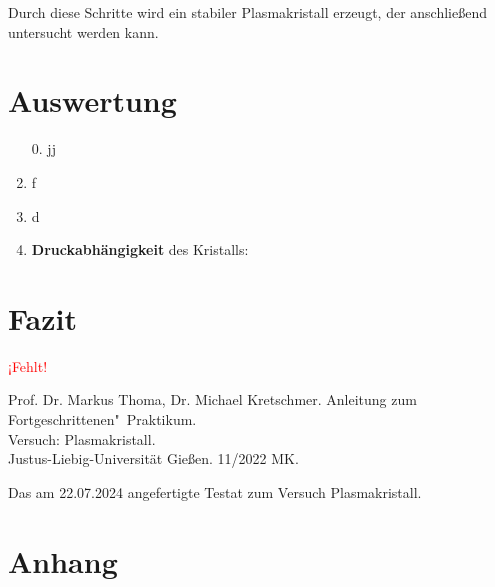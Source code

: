 \documentclass[12pt,a4paper,ngerman]{report}
\providecommand{\fehlt}{\textcolor{red}{{ ¡Fehlt! }}}
\begin{document}
Durch diese Schritte wird ein stabiler Plasmakristall erzeugt, der anschließend untersucht werden kann.	


\chapter{Auswertung}
	
	\begin{enumerate}[font=\bfseries]
		\item[0.] jj
		\item f
		\item d
		\setcounter{enumi}{4} %
		\item \textbf{Druckabhängigkeit} des Kristalls: 
	\end{enumerate}

\chapter{Fazit}
	\fehlt

\listoffigures%
	
\begin{thebibliography}{111}%
	Prof. Dr. Markus Thoma, Dr. Michael Kretschmer. Anleitung zum Fortgeschrittenen"~Praktikum.\\ \glqq Versuch: Plasmakristall\grqq.\\ Justus-Liebig-Universität Gießen. 11/2022 MK.
	
		Das am 22.07.2024 angefertigte Testat zum Versuch \glqq Plasmakristall\grqq.
	\end{thebibliography}


\chapter*{Anhang}\label{ch:Anhang}
\FloatBarrier
\end{document}
